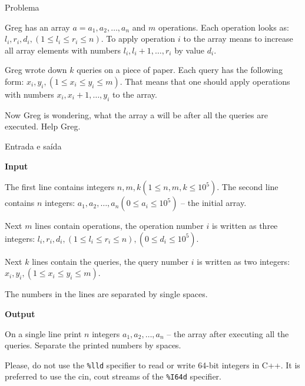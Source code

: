 
\begin{frame}[fragile]{Problema}

Greg has an array $a = a_1, a_2, \ldots, a_n$ and $m$ operations. Each operation looks as: 
$l_i, r_i, d_i, (1\leq l_i\leq r_i\leq n)$. To apply operation $i$ to the array means to increase 
all array elements with numbers $l_i, l_i + 1, \ldots, r_i$ by value $d_i$.

Greg wrote down $k$ queries on a piece of paper. Each query has the following form: 
$x_i, y_i, (1\leq x_i\leq y_i\leq m)$. That means that one should apply operations with numbers 
$x_i, x_i + 1, \ldots, y_i$ to the array.

Now Greg is wondering, what the array a will be after all the queries are executed. Help Greg.

\end{frame}

\begin{frame}[fragile]{Entrada e saída}

\textbf{Input}

The first line contains integers $n, m, k (1\leq n, m, k\leq 10^5)$. The second line contains 
$n$ integers: $a_1, a_2, \ldots, a_n (0\leq a_i\leq 10^5)$ -- the initial array.

Next $m$ lines contain operations, the operation number $i$ is written as three integers: 
$l_i, r_i, d_i, (1\leq l_i\leq r_i\leq n), (0\leq d_i\leq 10^5)$.

Next $k$ lines contain the queries, the query number $i$ is written as two integers: 
$x_i, y_i, (1\leq x_i\leq y_i\leq m)$.

The numbers in the lines are separated by single spaces.

\textbf{Output}

On a single line print $n$ integers $a_1, a_2,\ldots, a_n$ -- the array after executing all the queries. Separate the printed numbers by spaces.

Please, do not use the \texttt{\%lld} specifier to read or write 64-bit integers in C++. It is preferred to use the cin, cout streams of the \texttt{\%I64d} specifier.

\end{frame}

